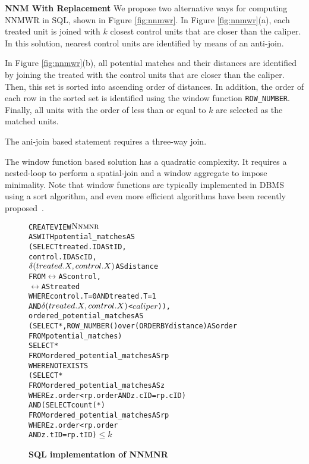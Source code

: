 {\bf NNM With Replacement}
We propose two alternative ways for computing  NNMWR in SQL, shown in
Figure \ref{fig:nnmwr}. In Figure \ref{fig:nnmwr}(a), each treated unit is joined with $k$ closest control units that are closer than the caliper. In this solution, nearest control units are identified by means of an anti-join.   In Figure \ref{fig:nnmwr}(b), all potential matches and their distances are identified by
joining the treated with the control units that are closer than
the caliper. Then, this set is sorted into ascending order of
distances.  In addition, the order of each row in the sorted set is identified
using the window function {\verb|ROW_NUMBER|}. Finally, all units with the order of less than or equal to $k$ are selected as the matched units.


The ani-join based statement requires a three-way join.  The window function based
solution has a quadratic complexity. It requires a nested-loop to
perform a spatial-join and a window aggregate to impose
minimality. Note that window functions are typically implemented in
DBMS using a sort algorithm, and even more efficient algorithms have
been recently proposed~\cite{Neumann15}.






\begin{figure}
  \centering
\begin{alltt} 
CREATE VIEW \(\nnmnr\)
AS WITH potential_matches AS
  (SELECT treated.ID AS tID, 
          control.ID AS cID,
          \(\delta(treated.\cv,control.\cv)\)  AS distance
   FROM \(\rel\) AS control, 
        \(\rel\) AS treated
   WHERE control.T=0 AND treated.T=1
     AND \(\delta(treated.\cv,control.\cv)\) < \(caliper\))),
            ordered_potential_matches AS
  (SELECT *, ROW_NUMBER() over (ORDER BY distance) AS order
   FROM potential_matches)
SELECT *
FROM ordered_potential_matches AS rp
WHERE NOT EXISTS
    (SELECT *
     FROM ordered_potential_matches AS z
     WHERE z.order < rp.order AND z.cID=rp.cID)
  AND (SELECT count(*)
     FROM ordered_potential_matches AS rp
     WHERE z.order < rp.order 
           AND z.tID=rp.tID)\( \leq k\)
\end{alltt} 
  \caption{\bf SQL implementation of NNMNR}\label{fig:nnmnr}
\end{figure}


